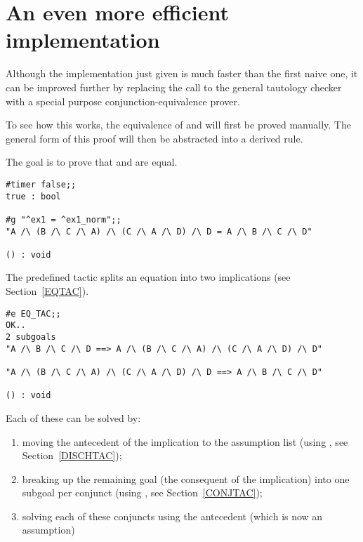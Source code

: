 \section{An even more efficient implementation}\label{bogus-optimization}

Although the implementation just given is much faster than the first
naive one, it can be improved further by replacing the call to the
general tautology checker with a special purpose conjunction-equivalence
prover.

To see how this works, the equivalence of  and  will first
be proved manually. The general form of this proof will then be abstracted into
a derived rule.

The goal is to prove that  and  are equal.

\begin{session}\begin{verbatim}
#timer false;;
true : bool

#g "^ex1 = ^ex1_norm";;
"A /\ (B /\ C /\ A) /\ (C /\ A /\ D) /\ D = A /\ B /\ C /\ D"

() : void
\end{verbatim}\end{session}

\noindent The predefined tactic  splits an equation into two
implications (see Section~\ref{EQTAC}).

\begin{session}\begin{verbatim}
#e EQ_TAC;;
OK..
2 subgoals
"A /\ B /\ C /\ D ==> A /\ (B /\ C /\ A) /\ (C /\ A /\ D) /\ D"

"A /\ (B /\ C /\ A) /\ (C /\ A /\ D) /\ D ==> A /\ B /\ C /\ D"

() : void
\end{verbatim}\end{session}

\noindent Each of these can be solved by:
\begin{enumerate}
\item moving the antecedent of the
implication to the assumption list (using , see
Section~\ref{DISCHTAC});
\item breaking up the remaining
goal (the consequent of the implication) into one subgoal per conjunct (using
, see Section~\ref{CONJTAC});
\item  solving each of these
conjuncts using the antecedent (which is now an assumption)
\end{enumerate}

